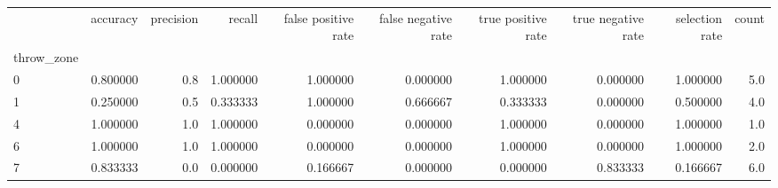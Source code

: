 \begin{tabular}{lrrrrrrrrr}
\toprule
{} &  accuracy &  precision &    recall &  false positive rate &  false negative rate &  true positive rate &  true negative rate &  selection rate &  count \\
throw\_zone &           &            &           &                      &                      &                     &                     &                 &        \\
\midrule
0          &  0.800000 &        0.8 &  1.000000 &             1.000000 &             0.000000 &            1.000000 &            0.000000 &        1.000000 &    5.0 \\
1          &  0.250000 &        0.5 &  0.333333 &             1.000000 &             0.666667 &            0.333333 &            0.000000 &        0.500000 &    4.0 \\
4          &  1.000000 &        1.0 &  1.000000 &             0.000000 &             0.000000 &            1.000000 &            0.000000 &        1.000000 &    1.0 \\
6          &  1.000000 &        1.0 &  1.000000 &             0.000000 &             0.000000 &            1.000000 &            0.000000 &        1.000000 &    2.0 \\
7          &  0.833333 &        0.0 &  0.000000 &             0.166667 &             0.000000 &            0.000000 &            0.833333 &        0.166667 &    6.0 \\
\bottomrule
\end{tabular}
